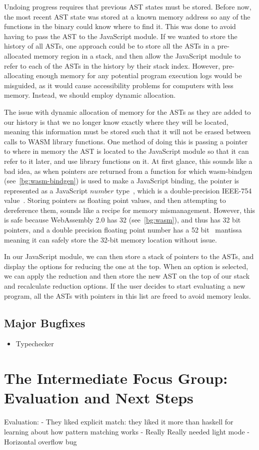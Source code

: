 Undoing progress requires that previous \ac{AST} states must be stored. Before now, the most recent \ac{AST} state was stored at a known memory address so any of the functions in the binary could know where to find it. This was done to avoid having to pass the \ac{AST} to the JavaScript module. If we wanted to store the history of all \ac{AST}s, one approach could be to store all the \ac{AST}s in a pre-allocated memory region in a stack, and then allow the JavaScript module to refer to each of the \ac{AST}s in the history by their stack index. However, pre-allocating enough memory for any potential program execution logs would be misguided, as it would cause accessibility problems for computers with less memory. Instead, we should employ dynamic allocation. 

The issue with dynamic allocation of memory for the \ac{AST}s as they are added to our history is that we no longer know exactly where they will be located, meaning this information must be stored such that it will not be erased between calls to \ac{WASM} library functions. One method of doing this is passing a pointer to where in memory the \ac{AST} is located to the JavaScript module so that it can refer to it later, and use library functions on it. At first glance, this sounds like a bad idea, as when pointers are returned from a function for which wasm-bindgen (see~\ref{bg:wasm-bindgen}) is used to make a JavaScript binding, the pointer is represented as a JavaScript $number$ type~\cite{wasm_bindgen_guide}, which is a double-precision IEEE-754 value~\cite{ecma262number}. Storing pointers as floating point values, and then attempting to dereference them, sounds like a recipe for memory mismanagement. However, this is safe because WebAssembly 2.0 has 32 (see~\ref{bg:wasm}), and thus has 32 bit pointers, and a double precision floating point number has a 52 bit~\cite{ieee754} mantissa meaning it can safely store the 32-bit memory location without issue. 

In our JavaScript module, we can then store a stack of pointers to the \ac{AST}s, and display the options for reducing the one at the top. When an option is selected, we can apply the reduction and then store the new \ac{AST} on the top of our stack and recalculate reduction options. If the user decides to start evaluating a new program, all the \ac{AST}s with pointers in this list are freed to avoid memory leaks.
\subsection{Major Bugfixes}
\begin{itemize}
    \item Typechecker
\end{itemize}

\section{The Intermediate Focus Group: Evaluation and Next Steps}
\label{eval:IFG}
Evaluation:
- They liked explicit match: they liked it more than haskell for learning about how pattern matching works
- Really Really needed light mode
- Horizontal overflow bug